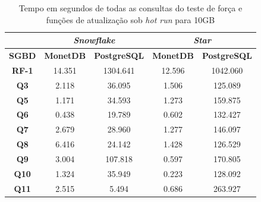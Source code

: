 \begin{table}[t]
        \centering
        \caption{Tempo em segundos de todas as consultas do teste de força e funções de atualização sob \textit{hot run} para 10GB}
        \label{tab:queries_hot_10}
        \begin{tabular}{|c|c|c|c|c|} 
                \cline{2-5}
                \multicolumn{1}{c|}{} & \multicolumn{2}{c|}{\textit{\textbf{Snowflake}} } & \multicolumn{2}{c|}{\textit{\textbf{Star}} }  \\ 
                \hline
                 \textbf{SGBD}        & \textbf{MonetDB}  & \textbf{PostgreSQL}           & \textbf{MonetDB}  & \textbf{PostgreSQL}       \\ 
                \hline
                 \textbf{RF-1}        & 14.351            & 1304.641                      & 12.596            & 1042.060                  \\ 
                \hline
                 \textbf{Q3}          & 2.118             & 36.095                        & 1.506             & 125.089                   \\ 
                \hline
                 \textbf{Q5}          & 1.171             & 34.593                        & 1.273             & 159.875                   \\ 
                \hline
                 \textbf{Q6}          & 0.438             & 19.789                        & 0.602             & 132.427                   \\ 
                \hline
                 \textbf{Q7}          & 2.679             & 28.960                        & 1.277             & 146.097                   \\ 
                \hline
                 \textbf{Q8}          & 6.416             & 24.142                        & 1.428             & 126.529                   \\ 
                \hline
                 \textbf{Q9}          & 3.004             & 107.818                       & 0.597             & 170.805                   \\ 
                \hline
                 \textbf{Q10}         & 1.324             & 35.949                        & 0.223             & 128.092                   \\ 
                \hline
                 \textbf{Q11}         & 2.515             & 5.494                         & 0.686             & 263.927                   \\ 
                \hline

\end{tabular}
\end{table}
